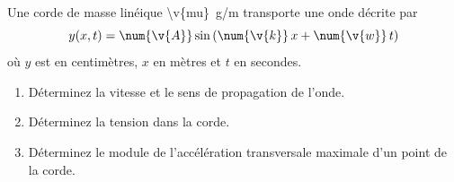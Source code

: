Une corde de masse linéique \qty{\v{mu}}{g/m} transporte une onde décrite par
\[ y(x,t) = \num{\v{A}}\sin\left(\num{\v{k}}\,x + \num{\v{w}}\,t\right) \]
où $y$ est en centimètres, $x$ en mètres et $t$ en secondes.

\begin{enumerate}[label=\alph*)]
    \item Déterminez la vitesse et le sens de propagation de l'onde.
    \item Déterminez la tension dans la corde.
    \item Déterminez le module de l'accélération transversale maximale d'un point de la corde.
\end{enumerate}

